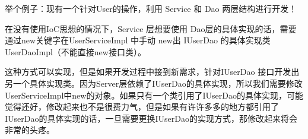 \documentclass[../../../interview-questions.tex]{subfiles}
\begin{document}
举个例子：现有一个针对User的操作，利用 Service 和 Dao 两层结构进行开发！

在没有使用IoC思想的情况下，Service 层想要使用 Dao层的具体实现的话，需要通过new关键字在UserServiceImpl 中手动 new出 IUserDao 的具体实现类 UserDaoImpl（不能直接new接口类）。

这种方式可以实现，但是如果开发过程中接到新需求，针对IUserDao 接口开发出另一个具体实现类。因为Server层依赖了IUserDao的具体实现，所以我们需要修改UserServiceImpl中new的对象。如果只有一个类引用了IUserDao的具体实现，可能觉得还好，修改起来也不是很费力气，但是如果有许许多多的地方都引用了IUserDao的具体实现的话，一旦需要更换IUserDao的实现方式，那修改起来将会非常的头疼。
\end{document}
